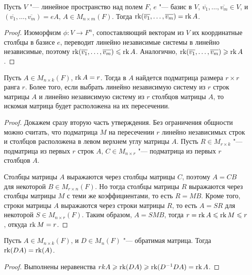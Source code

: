 \begin{proposition}
	Пусть $V$ "--- линейное пространство над полем $F$, $e$ "--- базис в $V$, $\overline{v_1}, \dots, \overline{v_m} \in V$, и $(\overline{v_1}, \dots, \overline{v_m}) = eA$, $A \in M_{n \times m}(F)$. Тогда $\rk(\overline{v_1}, \dots, \overline{v_m}) \hm{=} \rk{A}$.
\end{proposition}

\begin{proof}
	Изоморфизм $\phi: V \to F^n$, сопоставляющий векторам из $V$ их координатные столбцы в базисе $e$, переводит линейно независимые системы в линейно независимые, поэтому $\operatorname{rk}(\overline{v_1}, \dots, \overline{v_m}) \leqslant \operatorname{rk}{A}$. Аналогично, $\operatorname{rk}(\overline{v_1}, \dots, \overline{v_m}) \geqslant \operatorname{rk}{A}$.
\end{proof}

\begin{theorem}
	Пусть $A \in M_{n \times k}(F)$, $\operatorname{rk}{A} = r$. Тогда в $A$ найдется подматрица размера $r \times r$ ранга $r$. Более того, если выбрать линейно независимую систему из $r$ строк матрицы $A$ и линейно независимую систему из $r$ столбцов матрицы $A$, то искомая матрица будет расположена на их пересечении.
\end{theorem}

\begin{proof}
	Докажем сразу вторую часть утверждения. Без ограничения общности можно считать, что подматрица $M$ на пересечении $r$ линейно независимых строк и столбцов расположена в левом верхнем углу матрицы $A$. Пусть $R \in M_{r \times k}$ "--- подматрица из первых $r$ строк $A$, $C \in M_{n \times r}$ "--- подматрица из первых $r$ столбцов $A$.
	
	Столбцы матрицы $A$ выражаются через столбцы матрицы $C$, поэтому $A = CB$ для некоторой $B \in M_{r \times n}(F)$. Но тогда столбцы матрицы $R$ выражаются через столбцы матрицы $M$ с теми же коэффициентами, то есть $R = MB$. Кроме того, строки матрицы $A$ выражаются через строки матрицы $R$, то есть $A = SR$ для некоторой $S \in M_{n \times r}(F)$. Таким образом, $A = SMB$, тогда $r = \operatorname{rk}{A} \leqslant \operatorname{rk}{M} \leqslant r$, откуда $\operatorname{rk}{M} = r$.
\end{proof}

\begin{proposition}
	Пусть $A \in M_{n \times k}(F)$, и $D \in M_{n}(F)$ "--- обратимая матрица. Тогда $\operatorname{rk}(DA) = \operatorname{rk}(A)$.
\end{proposition}

\begin{proof}
	Выполнены неравенства $rk{A} \geqslant \operatorname{rk}(DA) \geqslant \operatorname{rk}(D^{-1}DA) = \operatorname{rk}{A}$.
\end{proof}

